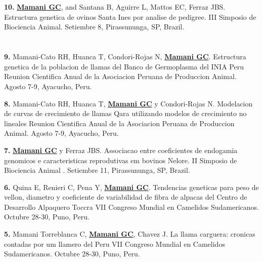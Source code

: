 \documentclass[margin,line,10pt]{res}
\newenvironment{list1}{
  \begin{list}{\ding{113}}{%
      \setlength{\itemsep}{0in}
      \setlength{\parsep}{0in} \setlength{\parskip}{0in}
      \setlength{\topsep}{0in} \setlength{\partopsep}{0in} 
      \setlength{\leftmargin}{0.17in}}}{\end{list}}
\begin{document}
\begin{resume}
\section{}
\begin{list1}
\item [\bf{10}.] {\bf \underline{Mamani GC}}, and Santana B, Aguirre L, Mattos EC, Ferraz JBS. 
Estructura genetica de ovinos Santa Ines por analise de pedigree.
III Simposio de Biociencia Animal. Setiembre 8, Pirassununga, SP, Brazil. 
\end{list1}

\section{}
\begin{list1}
\item [\bf{9}.] Mamani-Cato RH, Huanca T, Condori-Rojas N, {\bf \underline{Mamani GC}}.
Estructura genetica de la poblacion de llamas del Banco de Germoplasma del INIA Peru
Reunion Cientifica Anual de la Asociacion Peruana de Produccion Animal. Agosto 7-9, Ayacucho, Peru. 
\vspace{0.5cm}

\item [\bf{8}.] Mamani-Cato RH, Huanca T, {\bf \underline{Mamani GC}} y Condori-Rojas N.
Modelacion de curvas de crecimiento de llamas Qara utilizando modelos de crecimiento no lineales
Reunion Cientifica Anual de la Asociacion Peruana de Produccion Animal. Agosto 7-9, Ayacucho, Peru. 
\vspace{0.5cm}

\item [\bf{7}.] {\bf \underline{Mamani GC}} y Ferraz JBS. 
Associacao entre coeficientes de endogamia genomicos e caracteristicas reprodutivas em bovinos Nelore.
II Simposio de Biociencia Animal . Setiembre 11, Pirassununga, SP, Brazil. 
\vspace{0.5cm}

\item [\bf{6}.] Quina E, Renieri C, Pena Y, {\bf \underline{Mamani GC}}.
Tendencias geneticas para peso de vellon, diametro y coeficiente de variabilidad de fibra de alpacas del Centro de Desarrollo Alpaquero Toccra
VII Congreso Mundial en Camelidos Sudamericanos. Octubre 28-30, Puno, Peru. 
\vspace{0.5cm}

\item [\bf{5}.] Mamani Torreblanca C, {\bf \underline{Mamani GC}}, Chavez J.
La llama carguera: cronicas contadas por um llamero del Peru
VII Congreso Mundial en Camelidos Sudamericanos. Octubre 28-30, Puno, Peru. 
\end{list1}
\vspace{0.5cm}


\end{resume}
\end{document}
